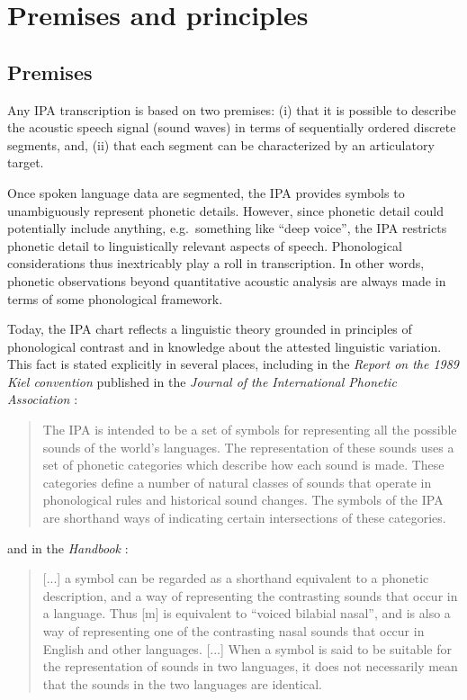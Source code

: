 
\section{Premises and principles}
\label{IPApremises-principles}
\subsection*{Premises}
\label{IPApremises}

Any IPA transcription is based on two premises: (i) that it is possible to
describe the acoustic speech signal (sound waves) in terms of sequentially
ordered discrete segments, and, (ii) that each segment can be characterized by
an articulatory target.

Once spoken language data are segmented, the IPA provides symbols to
unambiguously represent phonetic details. However, since phonetic detail could
potentially include anything, e.g.\ something like ``deep voice'', the IPA
restricts phonetic detail to linguistically relevant aspects of speech.
Phonological considerations thus inextricably play a roll in transcription. In
other words, phonetic observations beyond quantitative acoustic analysis are
always made in terms of some phonological framework.

Today, the IPA chart reflects a linguistic theory grounded in principles of
phonological contrast and in knowledge about the attested linguistic variation.
This fact is stated explicitly in several places, including in the
\textit{Report on the 1989 Kiel convention} published in the \textit{Journal of
the International Phonetic Association} \citep[67--68]{International1989report}:

\begin{quote}
The IPA is intended to be a set of symbols for representing all the possible 
sounds of the world's languages. The representation of these sounds uses a set 
of phonetic categories which describe how each sound is made. These categories 
define a number of natural classes of sounds that operate in phonological rules 
and historical sound changes. The symbols of the IPA are shorthand ways of 
indicating certain intersections of these categories.
\end{quote}

\noindent and in the \textit{Handbook} \citep[18]{IPA1999}: 

\begin{quote}
[...] a symbol can be regarded as a shorthand equivalent to a phonetic
description, and a way of representing the contrasting sounds that occur in a
language. Thus [m] is equivalent to ``voiced bilabial nasal'', and is also a way
of representing one of the contrasting nasal sounds that occur in English and
other languages. [...] When a symbol is said to be suitable for the
representation of sounds in two languages, it does not necessarily mean that the
sounds in the two languages are identical.
\end{quote}

